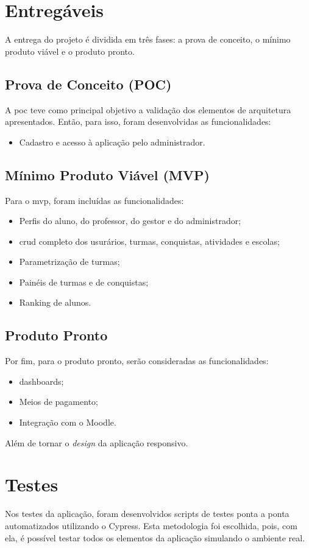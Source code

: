\documentclass[
    12pt,               %
    openright,          %
    oneside,
    a4paper,            %
    english,            %
    brazil              %
    ]{ifsp-spo-inf-ctds} %
\begin{document}
\section{Entregáveis}
A entrega do projeto é dividida em três fases: a prova de conceito, o mínimo produto viável e o produto pronto.

\subsection{Prova de Conceito (POC)}
A \ac{poc} teve como principal objetivo a validação dos elementos de arquitetura apresentados. Então, para isso, foram desenvolvidas as funcionalidades:
 \begin{itemize}
     \item Cadastro e acesso à aplicação pelo administrador.
 \end{itemize}

\subsection{Mínimo Produto Viável (MVP)}
Para o \ac{mvp}, foram incluídas as funcionalidades:
\begin{itemize}
    \item Perfis do aluno, do professor, do gestor e do administrador;
    \item \ac{crud} completo dos usurários, turmas, conquistas, atividades e escolas;
    \item Parametrização de turmas;
    \item Painéis de turmas e de conquistas;
    \item Ranking de alunos.
\end{itemize}

\subsection{Produto Pronto}
Por fim, para o produto pronto, serão consideradas as funcionalidades:

\begin{itemize}
    \item \glspl{dashboard};
    \item Meios de pagamento;
    \item Integração com o Moodle.
\end{itemize}

Além de tornar o \textit{design} da aplicação responsivo.

\section{Testes}
Nos testes da aplicação, foram desenvolvidos scripts de testes ponta a ponta automatizados utilizando o Cypress. Esta metodologia foi escolhida, pois, com ela, é possível testar todos os elementos da aplicação simulando o ambiente real. 
\end{document}
